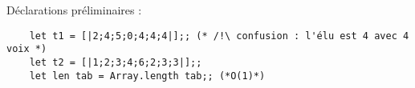 \documentclass[9pt]{report}
\begin{document}
    \sffamily

    

    \tableofcontents


    \vspace{2em}

    \noindent Déclarations préliminaires :
    
    \begin{verbatim}
    let t1 = [|2;4;5;0;4;4;4|];; (* /!\ confusion : l'élu est 4 avec 4 voix *)
    let t2 = [|1;2;3;4;6;2;3;3|];;
    let len tab = Array.length tab;; (*O(1)*)
    \end{verbatim}

    
    
    
    
    
    
    


    \cite{Baruch} %
    
    
\end{document}
